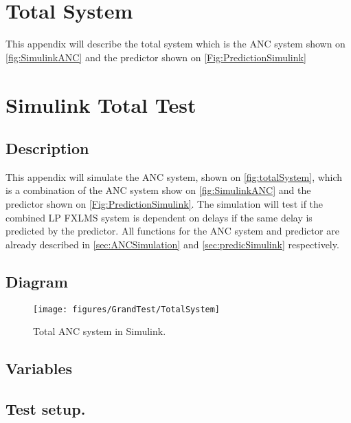 \section{Total System} \label{sec:TotalSystem}
This appendix will describe the total system which is the ANC system shown on \autoref{fig:SimulinkANC} and the predictor shown on \autoref{Fig:PredictionSimulink} 

\section{Simulink Total Test} \label{sec:SimulinkTotalSystem}

\subsection{Description}
This appendix will simulate the ANC system, shown on \autoref{fig:totalSystem}, which is a combination of the ANC system show on \autoref{fig:SimulinkANC} and the predictor shown on \autoref{Fig:PredictionSimulink}. The simulation will test if the combined LP FXLMS system is dependent on delays if the same delay is predicted by the predictor. All functions for the ANC system and predictor are already described in \autoref{sec:ANCSimulation} and \autoref{sec:predicSimulink} respectively. 

\subsection{Diagram}
\begin{figure}[H]
	\centering
	\texttt{[image: figures/GrandTest/TotalSystem]}
	\caption{Total ANC system in Simulink.}
	\label{fig:totalSystem}
\end{figure}


\subsection{Variables}



\subsection{Test setup.}

